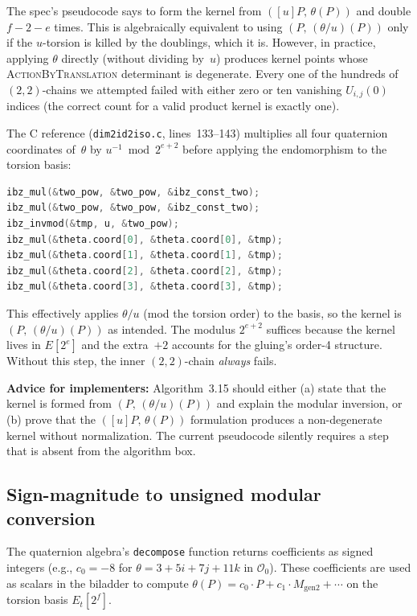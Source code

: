 The spec's pseudocode says to form the kernel from
$([u]P,\, \theta(P))$ and double $f - 2 - e$ times.  This is
algebraically equivalent to using $(P,\, (\theta/u)(P))$ only
if the $u$-torsion is killed by the doublings, which it is.
However, in practice, applying $\theta$ directly (without
dividing by~$u$) produces kernel points whose
\textsc{ActionByTranslation} determinant is degenerate.  Every
one of the hundreds of $(2,2)$-chains we attempted failed with
either zero or ten vanishing $U_{i,j}(0)$ indices (the correct
count for a valid product kernel is exactly one).

The C reference (\texttt{dim2id2iso.c}, lines~133--143) multiplies
all four quaternion coordinates of~$\theta$ by
$u^{-1} \bmod 2^{e+2}$ before applying the endomorphism to the
torsion basis:
\begin{lstlisting}[language=C]
ibz_mul(&two_pow, &two_pow, &ibz_const_two);
ibz_mul(&two_pow, &two_pow, &ibz_const_two);
ibz_invmod(&tmp, u, &two_pow);
ibz_mul(&theta.coord[0], &theta.coord[0], &tmp);
ibz_mul(&theta.coord[1], &theta.coord[1], &tmp);
ibz_mul(&theta.coord[2], &theta.coord[2], &tmp);
ibz_mul(&theta.coord[3], &theta.coord[3], &tmp);
\end{lstlisting}
This effectively applies $\theta/u$ (mod the torsion order) to the
basis, so the kernel is $(P,\, (\theta/u)(P))$ as intended.  The
modulus $2^{e+2}$ suffices because the kernel lives in $E[2^e]$ and
the extra~$+2$ accounts for the gluing's order-4 structure.  Without
this step, the inner $(2,2)$-chain \emph{always} fails.

\noindent
\textbf{Advice for implementers:} Algorithm~3.15 should either (a) state that the
kernel is formed from $(P,\, (\theta/u)(P))$ and explain the
modular inversion, or (b) prove that the $([u]P,\, \theta(P))$
formulation produces a non-degenerate kernel without normalization.
The current pseudocode silently requires a step that is absent from
the algorithm box.

\subsection{Sign-magnitude to unsigned modular conversion}
\label{sec:bug-scalar-sign}

The quaternion algebra's \texttt{decompose} function returns
coefficients as signed integers (e.g., $c_0 = -8$ for
$\theta = 3 + 5i + 7j + 11k$ in $\mathcal{O}_0$).  These
coefficients are used as scalars in the biladder to compute
$\theta(P) = c_0 \cdot P + c_1 \cdot M_{\mathrm{gen2}} + \cdots$
on the torsion basis $E_t[2^f]$.

